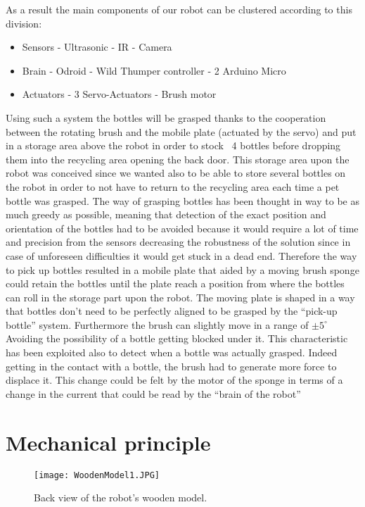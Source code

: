 As a result the main components of our robot can be clustered according to this division:
\begin{itemize}
\item Sensors
\subitem - Ultrasonic
\subitem  - IR
\subitem  - Camera
\item Brain
\subitem  - Odroid
\subitem  - Wild Thumper controller
\subitem  - 2 Arduino Micro
\item Actuators
\subitem  - 3 Servo-Actuators
\subitem  - Brush motor
\end{itemize}

Using such a system the bottles will be grasped thanks to the cooperation between the rotating brush and the mobile plate (actuated by the servo) and put in a storage area above the robot in order to stock ~4 bottles before dropping them into the recycling area opening the back door.
This storage area upon the robot was conceived since we wanted also to be able to store several bottles on the robot in order to not have to return to the recycling area each time a pet bottle was grasped.
The way of grasping bottles has been thought in way to be as much greedy as possible, meaning that detection of the exact position and orientation of the bottles had to be avoided because it would require a lot of time and precision from the sensors decreasing the robustness of the solution since in case of unforeseen difficulties it would get stuck in a dead end.
Therefore the way to pick up bottles resulted in a mobile plate that aided by a moving brush sponge could retain the bottles until the  plate reach a position from where the bottles can roll in the storage part upon the robot.
The moving plate is shaped in a way that bottles don’t need to be perfectly aligned  to be grasped by the “pick-up bottle” system. Furthermore the brush can slightly move in a range of $\pm 5^{\circ}$ Avoiding the possibility of a bottle getting blocked under it.
 This characteristic has been exploited also to detect when a bottle was actually grasped. Indeed getting in the contact with a bottle, the brush had to generate more force to displace it. This change could be felt by the motor of the sponge in terms of a change in the current that could be read by the “brain of the robot”

\section{Mechanical principle}

\begin{wrapfigure}{l}{0.5\textwidth}
\begin{center}
\texttt{[image: WoodenModel1.JPG]}
\end{center}
\caption{Back view of the robot's wooden model.}
\label{fig:WoodenModel1}
\end{wrapfigure}

